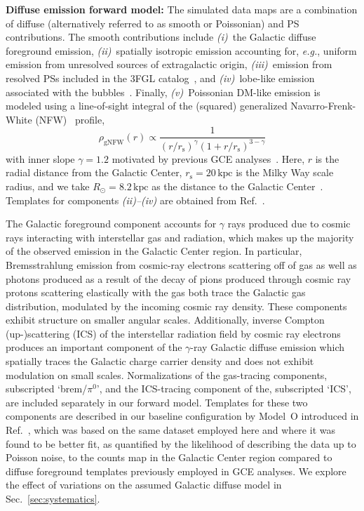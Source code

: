 \documentclass[prd,aps,10pt,nofootinbib,twocolumn,superscriptaddress,preprintnumbers,balancelastpage,longbibliography]{revtex4-1}
\begin{document}
\noindent
\textbf{Diffuse emission forward model:} The simulated data maps are a combination of diffuse (alternatively referred to as smooth or Poissonian) and PS contributions. The smooth contributions include \emph{(i)}~the Galactic diffuse foreground emission, \emph{(ii)}~spatially isotropic emission accounting for, \emph{e.g.}, uniform emission from unresolved sources of extragalactic origin, \emph{(iii)}~emission from resolved PSs included in the \Fermi 3FGL catalog~\cite{Fermi-LAT:2015bhf}, and \emph{(iv)}~lobe-like emission associated with the \Fermi bubbles~\cite{Su:2010qj}. Finally, \emph{(v)}~Poissonian DM-like emission is modeled using a line-of-sight integral of the (squared) generalized Navarro-Frenk-White (NFW)~\cite{Navarro:1995iw,Navarro:1996gj} profile,
\begin{equation}
\label{eq:nfw}
\rho_\mathrm{gNFW}(r) \propto \frac{1}{\left(r / r_{\mathrm s}\right)^{\gamma}\left(1+r / r_{\mathrm s}\right)^{3-\gamma}}
\end{equation}
with inner slope $\gamma=1.2$ motivated by previous GCE analyses~\cite{Gordon:2013vta,Daylan:2014rsa,Zhou:2014lva}. Here, $r$ is the radial distance from the Galactic Center, $r_{\mathrm s}=20\,\mathrm{kpc}$ is the Milky Way scale radius, and we take $R_\odot = 8.2\,\mathrm{kpc}$ as the distance to the Galactic Center~\cite{2020arXiv201202169B,2019A&A...625L..10G}. Templates for components \emph{(ii)--(iv)} are obtained from Ref.~\cite{Mishra-Sharma:2016gis}. 

The Galactic foreground component accounts for $\gamma$ rays produced due to cosmic rays interacting with interstellar gas and radiation, which makes up the majority of the observed emission in the Galactic Center region. In particular, Bremsstrahlung emission from cosmic-ray electrons scattering off of gas as well as photons produced as a result of the decay of pions produced through cosmic ray protons scattering elastically with the gas both trace the Galactic gas distribution, modulated by the incoming cosmic ray density. These components exhibit structure on smaller angular scales. Additionally, inverse Compton (up-)scattering (ICS) of the interstellar radiation field by cosmic ray electrons produces an important component of the $\gamma$-ray Galactic diffuse emission which spatially traces the Galactic charge carrier density and does not exhibit modulation on small scales. Normalizations of the gas-tracing components, subscripted `brem/$\pi^0$', and the ICS-tracing component of the, subscripted `ICS', are included separately in our forward model. Templates for these two components are described in our baseline configuration by {Model~O} introduced in Ref.~\cite{Buschmann:2020adf}, which was based on the same \Fermi dataset employed here and where it was found to be better fit, as quantified by the likelihood of describing the data up to Poisson noise, to the counts map in the Galactic Center region compared to diffuse foreground templates previously employed in GCE analyses. We explore the effect of variations on the assumed Galactic diffuse model in Sec.~\ref{sec:systematics}. 
\end{document}
